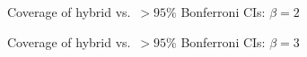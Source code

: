 \documentclass{beamer}
\begin{document}
\begin{frame}
\begin{figure}[h]
  \centering
\resizebox{0.75\textwidth}{!}{%
  
}
  
  \caption{Coverage of hybrid vs.\ $>95\%$ Bonferroni CIs: $\beta = 2$}
\end{figure}

\end{frame}
\begin{frame}
\begin{figure}[h]
  \centering
\resizebox{0.75\textwidth}{!}{%
  
}
  \caption{Coverage of hybrid vs.\ $>95\%$ Bonferroni CIs: $\beta = 3$}
  
\end{figure}

\end{frame}
\end{document}
